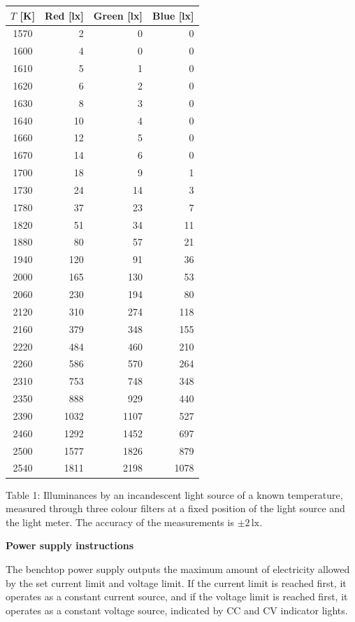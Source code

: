 \begin{center}
\begin{tabular}{||c||r|r|r||}
\hline
$T$ [K] & \multicolumn{1}{c|}{Red [lx]} & \multicolumn{1}{c|}{Green [lx]} & \multicolumn{1}{c||}{Blue [lx]} \\
\hline
1570 & 2 & 0 & 0 \\
1600 & 4 & 0 & 0 \\
1610 & 5 & 1 & 0 \\
1620 & 6 & 2 & 0 \\
1630 & 8 & 3 & 0 \\
1640 & 10 & 4 & 0 \\
1660 & 12 & 5 & 0 \\
1670 & 14 & 6 & 0 \\
1700 & 18 & 9 & 1 \\
1730 & 24 & 14 & 3 \\
1780 & 37 & 23 & 7 \\
1820 & 51 & 34 & 11 \\
1880 & 80 & 57 & 21 \\
1940 & 120 & 91 & 36 \\
2000 & 165 & 130 & 53 \\
2060 & 230 & 194 & 80 \\
2120 & 310 & 274 & 118 \\
2160 & 379 & 348 & 155 \\
2220 & 484 & 460 & 210 \\
2260 & 586 & 570 & 264 \\
2310 & 753 & 748 & 348 \\
2350 & 888 & 929 & 440 \\
2390 & 1032 & 1107 & 527 \\
2460 & 1292 & 1452 & 697 \\
2500 & 1577 & 1826 & 879 \\
2540 & 1811 & 2198 & 1078 \\
\hline
\end{tabular}
\end{center}

Table 1: Illuminances by an incandescent light source of a known temperature,
measured through three colour filters at a fixed position of the light source
and the light meter. The accuracy of the measurements is $\pm 2\,\mathrm{lx}$.

\textbf{Power supply instructions}

The benchtop power supply outputs the maximum amount of electricity allowed by
the set current limit and voltage limit. If the current limit is reached first,
it operates as a constant current source, and if the voltage limit is reached
first, it operates as a constant voltage source, indicated by CC and CV
indicator lights.


